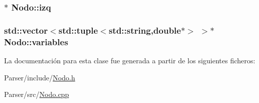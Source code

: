 \subsubsection[{\texorpdfstring{izq}{izq}}]{$\ast$ Nodo\+::izq}\hypertarget{class_nodo_a8e0d3bbd637491daad3716d8731881f7}{}\label{class_nodo_a8e0d3bbd637491daad3716d8731881f7}
\subsubsection[{\texorpdfstring{variables}{variables}}]{\setlength{\rightskip}{0pt plus 5cm}std\+::vector$<$std\+::tuple$<$std\+::string,double$\ast$$>$ $>$$\ast$ Nodo\+::variables}\hypertarget{class_nodo_afbf8312c82ff9a5b6194a6a252a1abae}{}\label{class_nodo_afbf8312c82ff9a5b6194a6a252a1abae}


La documentación para esta clase fue generada a partir de los siguientes ficheros\+:\begin{DoxyCompactItemize}
\item 
Parser/include/\hyperlink{_nodo_8h}{Nodo.\+h}\item 
Parser/src/\hyperlink{_nodo_8cpp}{Nodo.\+cpp}\end{DoxyCompactItemize}
